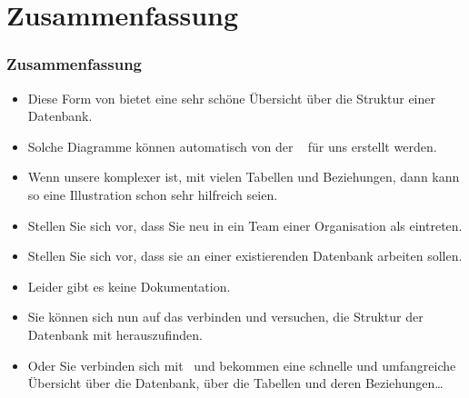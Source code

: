 \documentclass[aspectratio=169,mathserif,notheorems]{beamer}%
\begin{document}
\section{Zusammenfassung}%
%
\begin{frame}%
\frametitle{Zusammenfassung}%
\begin{itemize}%
\item Diese Form von  bietet eine sehr schöne Übersicht über die Struktur einer Datenbank.%
%
\item<2-> Solche Diagramme können automatisch von der \libreofficeBase\  für uns erstellt werden.%
%
\item<3-> Wenn unsere  komplexer ist, mit vielen Tabellen und Beziehungen, dann kann so eine Illustration schon sehr hilfreich seien.%
%
\item<4-> Stellen Sie sich vor, dass Sie neu in ein Team einer Organisation als  eintreten.%
%
\item<5-> Stellen Sie sich vor, dass sie an einer existierenden Datenbank arbeiten sollen.%
%
\item<6-> Leider gibt es keine Dokumentation.%
%
\item<7-> Sie können sich nun auf das  verbinden und versuchen, die Struktur der Datenbank mit  herauszufinden.%
%
\item<8-> Oder Sie verbinden sich mit \libreofficeBase\ und bekommen eine schnelle und umfangreiche Übersicht über die Datenbank, über die Tabellen und deren Beziehungen\dots%
\end{itemize}%
\end{frame}%
%
\endPresentation%
\end{document}
